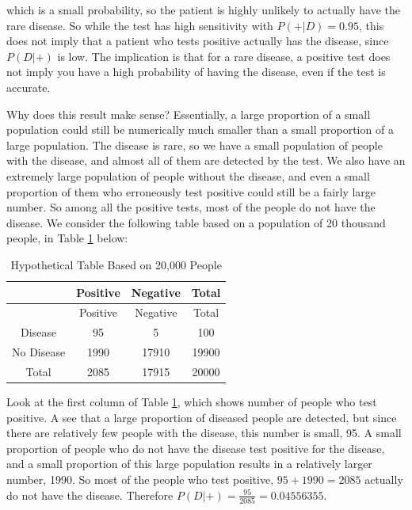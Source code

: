 \documentclass[
]{book}
\begin{document}
which is a small probability, so the patient is highly unlikely to actually have the rare disease. So while the test has high sensitivity with \(P(+|D) = 0.95\), this does not imply that a patient who tests positive actually has the disease, since \(P(D|+)\) is low. The implication is that for a rare disease, a positive test does not imply you have a high probability of having the disease, even if the test is accurate.

Why does this result make sense? Essentially, a large proportion of a small population could still be numerically much smaller than a small proportion of a large population. The disease is rare, so we have a small population of people with the disease, and almost all of them are detected by the test. We also have an extremely large population of people without the disease, and even a small proportion of them who erroneously test positive could still be a fairly large number. So among all the positive tests, most of the people do not have the disease. We consider the following table based on a population of 20 thousand people, in Table \ref{tab:disease} below:

\begin{longtable}[]{@{}cccc@{}}
\caption{\label{tab:disease} Hypothetical Table Based on 20,000 People}\tabularnewline
\toprule\noalign{}
& Positive & Negative & Total \\
\midrule\noalign{}
\endfirsthead
\toprule\noalign{}
& Positive & Negative & Total \\
\midrule\noalign{}
\endhead
\bottomrule\noalign{}
\endlastfoot
Disease & 95 & 5 & 100 \\
No Disease & 1990 & 17910 & 19900 \\
Total & 2085 & 17915 & 20000 \\
\end{longtable}

Look at the first column of Table \ref{tab:disease}, which shows number of people who test positive. A see that a large proportion of diseased people are detected, but since there are relatively few people with the disease, this number is small, 95. A small proportion of people who do not have the disease test positive for the disease, and a small proportion of this large population results in a relatively larger number, 1990. So most of the people who test positive, \(95 + 1990 = 2085\) actually do not have the disease. Therefore \(P(D|+) = \frac{95}{2085} = 0.04556355\).
\end{document}
